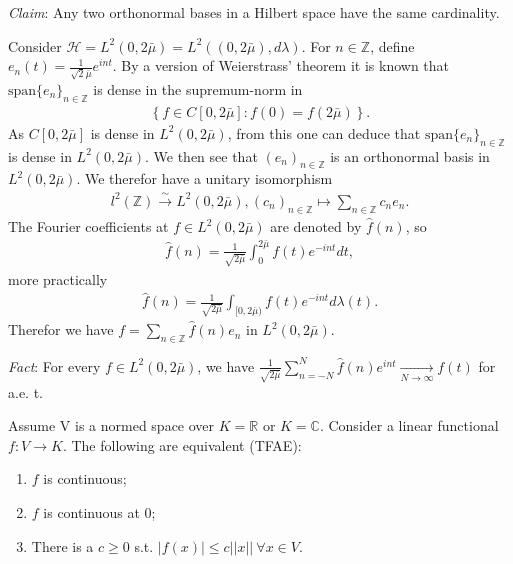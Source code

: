 \emph{Claim}: Any two orthonormal bases in a Hilbert space have the same cardinality.
\begin{example}
    Consider \(\mathcal{H} = L^2(0,2\bar{\mu}) = L^2((0,2\bar{\mu}), d\lambda)\). For \(n\in\mathbb{Z}\), define
    \(e_n(t) = \frac{1}{\sqrt{2}\bar{\mu}}e^{int}\). By a version of Weierstrass' theorem it is known that 
    \(\text{span}\{e_n\}_{n\in\mathbb{Z}}\) is dense in the supremum-norm in 
    \begin{align*}
        \left\{f\in C[0,2\bar{\mu}]: f(0)=f(2\bar{\mu})\right\}.
    \end{align*}
    As \(C[0,2\bar{\mu}]\) is dense in \(L^2(0,2\bar{\mu})\), from this one can deduce that \(\text{span}\{e_n\}_{n\in\mathbb{Z}}\) is dense
    in \(L^2(0,2\bar{\mu})\). We then see that \((e_n)_{n\in\mathbb{Z}}\) is an orthonormal basis in \(L^2(0,2\bar{\mu})\). We therefor
    have a unitary isomorphism
    \begin{align*}
        l^2(\mathbb{Z}) \xrightarrow[ ]{\sim}L^2(0,2\bar{\mu}), (c_n)_{n\in\mathbb{Z}} \mapsto \sum\limits_{n\in\mathbb{Z}}c_n e_n.
    \end{align*}
    The Fourier coefficients at \(f\in L^2(0,2\bar{\mu})\) are denoted by \(\hat{f}(n)\), so 
    \begin{align*}
        \hat{f}(n) = \frac{1}{\sqrt{2\bar{\mu}}}\int_{0}^{2\bar{\mu}} f(t) e^{-int}dt,
    \end{align*}
    more practically
    \begin{align*}
        \hat{f}(n) = \frac{1}{\sqrt{2\bar{\mu}}}\int_{[0,2\bar{\mu})} f(t) e^{-int}d\lambda(t).
    \end{align*}
    Therefor we have \(f=\sum_{n\in\mathbb{Z}} \hat{f}(n)e_n\) in \(L^2(0,2\bar{\mu})\).

    \emph{Fact}: For every \(f\in L^2(0,2\bar{\mu})\), we have \(\frac{1}{\sqrt{2\bar{\mu}}} \sum_{n=-N}^{N} \hat{f}(n)e^{int}
    \xrightarrow[N\rightarrow\infty]{ } f(t)\) for a.e. t.
\end{example}
\fi 
\begin{lemma}
    Assume V is a normed space over \(K=\mathbb{R}\) or \(K=\mathbb{C}\). Consider a linear functional \(f:V\rightarrow K\). The following
    are equivalent (TFAE):
    \begin{enumerate}[label=(\roman*)]
        \item \(f\) is continuous;
        \item \(f\) is continuous at 0;
        \item There is a \(c\geq0\) s.t. \(|f(x)|\leq c ||x|| \ \forall x\in V\).
    \end{enumerate}
\end{lemma}

